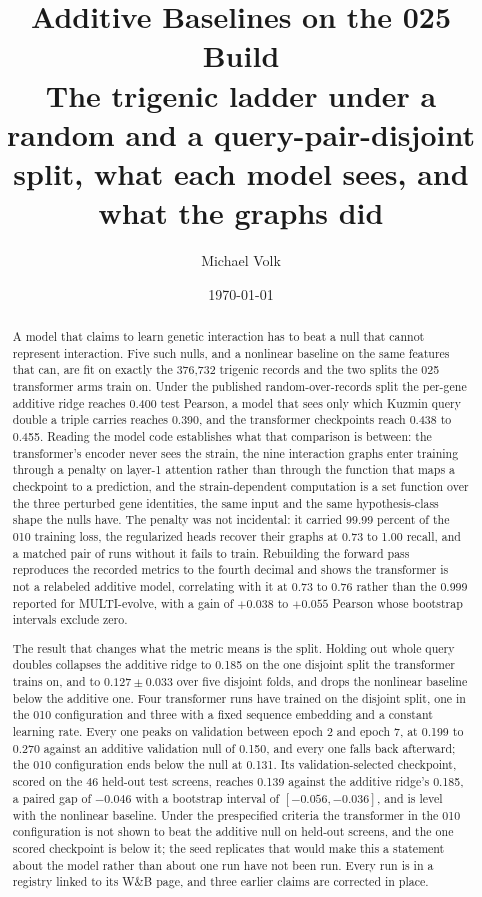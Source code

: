 \documentclass[10pt,a4paper]{article}
\title{\vspace{-1.5em}Additive Baselines on the 025 Build\\
  {\large The trigenic ladder under a random and a query-pair-disjoint split,
   what each model sees, and what the graphs did}}
\author{Michael Volk}
\date{\today}
\begin{document}
\maketitle
\thispagestyle{empty}

\begin{abstract}
\noindent
A model that claims to learn genetic interaction has to beat a null that cannot
represent interaction. Five such nulls, and a nonlinear baseline on the same
features that can, are fit on exactly the 376{,}732 trigenic records and the two
splits the 025 transformer arms train on. Under the published random-over-records
split the per-gene additive ridge reaches 0.400 test Pearson, a model that sees
only which Kuzmin query double a triple carries reaches 0.390, and the transformer
checkpoints reach 0.438 to 0.455. Reading the model code establishes what that
comparison is between: the transformer's encoder never sees the strain, the nine
interaction graphs enter training through a penalty on layer-1 attention rather
than through the function that maps a checkpoint to a prediction, and the
strain-dependent computation is a set function over the three perturbed gene
identities, the same input and the same hypothesis-class shape the nulls have. The
penalty was not incidental: it carried 99.99 percent of the 010 training loss, the
regularized heads recover their graphs at 0.73 to 1.00 recall, and a matched pair
of runs without it fails to train. Rebuilding the forward pass reproduces the
recorded metrics to the fourth decimal and shows the transformer is not a relabeled
additive model, correlating with it at 0.73 to 0.76 rather than the 0.999 reported
for MULTI-evolve, with a gain of $+0.038$ to $+0.055$ Pearson whose bootstrap
intervals exclude zero.

The result that changes what the metric means is the split. Holding out whole query
doubles collapses the additive ridge to 0.185 on the one disjoint split the
transformer trains on, and to $0.127 \pm 0.033$ over five disjoint folds, and drops
the nonlinear baseline below the additive one. Four transformer runs have trained
on the disjoint split, one in the 010 configuration and three with a fixed sequence
embedding and a constant learning rate. Every one peaks on validation between epoch
2 and epoch 7, at 0.199 to 0.270 against an additive validation null of 0.150, and
every one falls back afterward; the 010 configuration ends below the null at 0.131.
Its validation-selected checkpoint, scored on the 46 held-out test screens, reaches
0.139 against the additive ridge's 0.185, a paired gap of $-0.046$ with a bootstrap
interval of $[-0.056, -0.036]$, and is level with the nonlinear baseline. Under the
prespecified criteria the transformer in the 010 configuration is not shown to beat
the additive null on held-out screens, and the one scored checkpoint is below it;
the seed replicates that would make this a statement about the model rather than
about one run have not been run. Every run is in a registry linked to its W\&B
page, and three earlier claims are corrected in place.
\end{abstract}

\vspace{0.5em}
\tccontents
\clearpage








\end{document}
